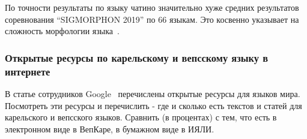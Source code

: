 \bigskip
По точности результаты по языку чатино значительно хуже
средних результатов соревнования ``SIGMORPHON 2019'' по 66 языкам.
Это косвенно указывает на сложность морфологии языка~\cite[2822]{Cruz-Anastasopoulos-Stump2020Chatino}.


\subsubsection{Открытые ресурсы по карельскому и вепсскому языку в интернете} \label{sect_open_krl_vep_inet}

В статье сотрудников Google~\cite{Prasad2018} перечислены открытые ресурсы для языков мира.
Посмотреть эти ресурсы и перечислить - где и сколько есть текстов и статей
для карельского и вепсского языков. Сравнить (в процентах) с тем, что есть
в электронном виде в ВепКаре, в бумажном виде в ИЯЛИ.









